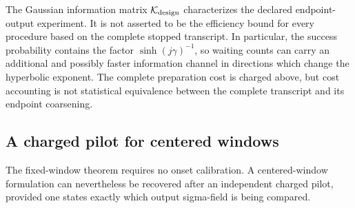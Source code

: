 \begin{remark}
\label{rem:v21-endpoint-coarsening}
The Gaussian information matrix $\mathcal K_{\rm design}$ characterizes the
declared endpoint-output experiment.  It is not asserted to be the efficiency
bound for every procedure based on the complete stopped transcript.  In
particular, the success probability contains the factor
$\sinh(j\gamma)^{-1}$, so waiting counts can carry an additional and possibly
faster information channel in directions which change the hyperbolic
exponent.  The complete preparation cost is charged above, but cost accounting
is not statistical equivalence between the complete transcript and its
endpoint coarsening.
\end{remark}

\subsection{A charged pilot for centered windows}

The fixed-window theorem requires no onset calibration.  A centered-window
formulation can nevertheless be recovered after an independent charged pilot,
provided one states exactly which output sigma-field is being compared.

